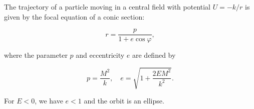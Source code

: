 The trajectory of a particle moving in a central field with potential $U = -k/r$ is given by the focal equation of a conic section:

$$r = \frac{p}{1 + e \cos \varphi},$$

where the parameter $p$ and eccentricity $e$ are defined by

$$p = \frac{M^2}{k}, \quad e = \sqrt{1 + \frac{2EM^2}{k^2}}.$$

For $E < 0$, we have $e < 1$ and the orbit is an ellipse.
